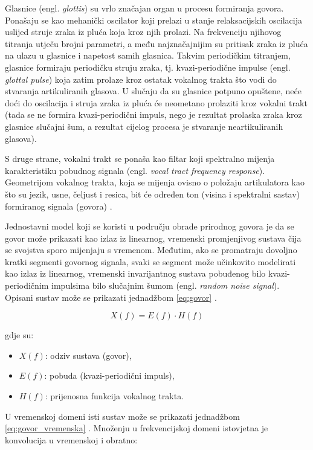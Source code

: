Glasnice (engl. \textit{glottis}) su vrlo značajan organ u procesu formiranja govora. 
Ponašaju se kao mehanički
oscilator koji prelazi u stanje relaksacijskih oscilacija uslijed struje zraka iz pluća koja kroz njih
prolazi. Na frekvenciju njihovog titranja utječu brojni parametri, a među najznačajnijim su
pritisak zraka iz pluća na ulazu u glasnice i napetost samih glasnica.
Takvim periodičkim titranjem, glasnice formiraju periodičku struju zraka, tj. 
kvazi-periodične impulse (engl. \textit{glottal pulse}) koja zatim prolaze kroz ostatak 
vokalnog trakta što vodi do stvaranja artikuliranih glasova. U slučaju da 
su glasnice potpuno opuštene, neće
doći do oscilacija i struja zraka iz pluća će neometano prolaziti kroz vokalni trakt 
(tada se ne formira kvazi-periodični impuls, nego je rezultat prolaska zraka kroz glasnice
slučajni šum, a rezultat cijelog procesa je stvaranje neartikuliranih glasova). 

S druge strane, vokalni trakt se ponaša kao filtar koji spektralno mijenja karakteristiku
pobudnog signala (engl. \textit{vocal tract frequency response}). 
Geometrijom vokalnog trakta, koja se mijenja ovisno o položaju 
artikulatora kao što su jezik, usne, čeljust i resica, bit će određen ton (visina i
spektralni sastav) formiranog signala (govora) \cite{petrinovic2002}. 

Jednostavni model koji se koristi u području obrade prirodnog govora je da se govor 
može prikazati kao izlaz iz linearnog, vremenski promjenjivog sustava čija se 
svojstva sporo mijenjaju s vremenom. Međutim, ako se promatraju dovoljno kratki
segmenti govornog signala, svaki se segment može učinkovito modelirati kao izlaz
iz linearnog, vremenski invarijantnog sustava pobuđenog bilo
kvazi-periodičnim impulsima bilo slučajnim šumom (engl. \textit{random noise signal}).
Opisani sustav može se prikazati jednadžbom \eqref{eq:govor} .

\begin{equation}
    X(f) = E(f) \cdot H(f)
    \label{eq:govor}
\end{equation}

gdje su:
\begin{itemize}
    \item \(X(f)\): odziv sustava (govor),
    \item \(E(f)\): pobuda (kvazi-periodični impuls),
    \item \(H(f)\): prijenosna funkcija vokalnog trakta.
\end{itemize}

U vremenskoj domeni isti sustav može se prikazati jednadžbom \eqref{eq:govor_vremenska} .
Množenju u frekvencijskoj domeni istovjetna je konvolucija u vremenskoj i obratno:

